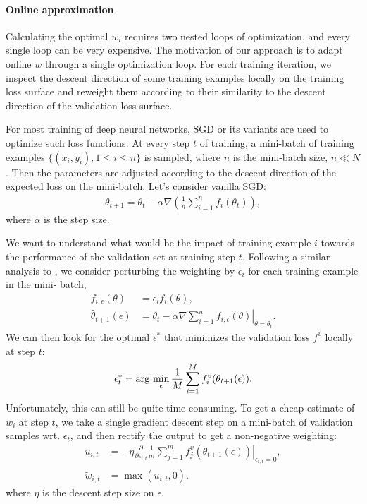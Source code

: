 \paragraph{Online approximation} Calculating the optimal $w_i$ requires two nested loops of
optimization, and every single loop can be very expensive. The motivation of our approach is to adapt
online $w$ through a single optimization loop. For each training iteration, we inspect the descent
direction of some training examples locally on the training loss surface and reweight them
according to their similarity to the descent direction of the validation loss surface.

For most training of deep neural networks, SGD or its variants are used to  optimize such loss
functions. At every step $t$ of training, a mini-batch of training examples $\{(x_i, y_i), 1 \le i
\le n\}$ is sampled, where $n$ is the mini-batch size, $n \ll N$. Then the parameters are adjusted
according  to the descent direction of the expected loss on the mini-batch. Let's consider vanilla
SGD:
\begin{align}
\theta_{t+1} = \theta_t - \alpha \nabla \left( \frac{1}{n}\sum_{i=1}^n f_i(\theta_t) \right),
\end{align}
where $\alpha$ is the step size.

We want to understand what would be the impact of training example $i$ towards  the performance of
the validation set at training step $t$. Following a similar analysis to \citet{kohL17influence}, we
consider perturbing the weighting by $\epsilon_i$ for each training example in the mini- batch,
\begin{align}
f_{i,\epsilon}(\theta) &= \epsilon_i f_i(\theta),\\
\hat{\theta}_{t+1}(\epsilon) &= \theta_t - \alpha \nabla \sum_{i=1}^n
\left. f_{i,\epsilon}(\theta) \right\vert_{\theta=\theta_t}.
\end{align}
We can then look for the optimal $\epsilon^*$ that minimizes the validation loss $f^v$ locally at step $t$:
\begin{align}
\epsilon^*_t = \arg\,\min_\epsilon \frac{1}{M} \sum_{i=1}^M f^v_i(\theta_{t+1}(\epsilon)).
\end{align}
Unfortunately,  this can still be quite time-consuming. To get a cheap estimate of $w_i$ at step
$t$, we take a single gradient descent step on a mini-batch of validation samples wrt.
$\epsilon_t$, and then rectify the output to get a non-negative weighting:
\begin{align}
\label{eq:meta-gradient}
u_{i,t} &= -\eta \frac{\partial}{\partial \epsilon_{i,t}} \frac{1}{m} 
            \sum_{j=1}^m \left. f_j^v(\theta_{t+1}(\epsilon)) \right \vert_{\epsilon_{i,t}=0},\\
\tilde{w}_{i,t} &= \max(u_{i,t}, 0).
\end{align}
where $\eta$ is the descent step size on $\epsilon$.

